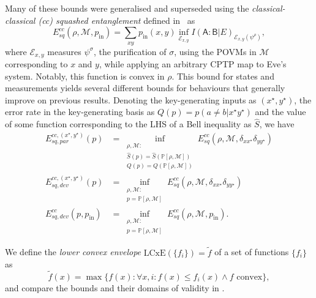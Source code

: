 \documentclass[10pt, a4paper]{article}
\numberwithin{equation}{section} %
\theoremstyle{definition}
\theoremstyle{plain}
\newcommand{\?}{\mathrel{?}} %
\newcommand{\sM}{\mathcal{M}}
\newcommand{\cE}{\mathcal{E}}
\newcommand{\crv}[1]{\mathsf{#1}}
\newcommand{\LCxE}[1]{\mathrm{LCxE}\left(#1\right)}
\newcommand{\prin}[1][p]{#1_{\mathrm{in}}}
\newcommand{\behav}[2]{\mathbb{P}\left[#1, #2\right]}
\begin{document}
    Many of these bounds were generalised and superseded using the \emph{classical-classical (cc) squashed entanglement} defined in~\cite{CCSquashedEntangle} as
    \begin{equation}
      E^{cc}_{sq}(\rho, \sM, \prin) = \sum_{xy} \prin(x,y) \inf_{\cE_{x,y}} I{(\crv{A} : \crv{B}|E)}_{\cE_{x,y}(\psi^{\rho})},
    \end{equation}
    where \(\cE_{x,y}\) measures \(\psi^\sigma\), the purification of \({\sigma}\), using the POVMs in \(\sM\) corresponding to \(x\) and \(y\), while applying an arbitrary CPTP map to Eve's system. Notably, this function is convex in \(\rho\). This bound for states and measurements yields several different bounds for behaviours that generally improve on previous results. Denoting the key-generating inputs as \((x^{\star},y^{\star})\), the error rate in the key-generating basis as \(Q(p) = p(a\neq{b}|x^{\star}y^{\star})\) and the value of some function corresponding to the LHS of a Bell inequality as \(\hat{S}\), we have
    \begin{align}
      E^{cc,(x^{\star},y^{\star})}_{sq,par}(p) &= \inf_{\substack{\rho, \sM : \\ \hat{S}(p) = \hat{S}(\behav{\rho}{ \sM}) \\ Q(p) = Q(\behav{\rho}{ \sM}) }} E^{cc}_{sq}(\rho, \sM, \delta_{xx^{\star}}\delta_{yy^{\star}}) \\
      E^{cc,(x^{\star},y^{\star})}_{sq,dev}(p) &= \inf_{\substack{\rho, \sM : \\ p = \behav{\rho}{ \sM}}} E^{cc}_{sq}(\rho, \sM, \delta_{xx^{\star}}\delta_{yy^{\star}}) \\
      E^{cc}_{sq,dev}(p,\prin) &= \inf_{\substack{\rho, \sM : \\ p = \behav{\rho}{ \sM}}} E^{cc}_{sq}(\rho, \sM, \prin).
    \end{align}

    We define the \emph{lower convex envelope} \(\LCxE{\{f_i\}} = \tilde{f}\) of a set of functions \(\{f_i\}\) as
    \begin{equation}\label{eqn:LCxEdef}
      \tilde{f}(x) = \max\{ f(x) : \forall x, i : f(x) \leq f_i(x) \land f\text{ convex} \},
    \end{equation}
    and compare the bounds and their domains of validity in .
\end{document}
